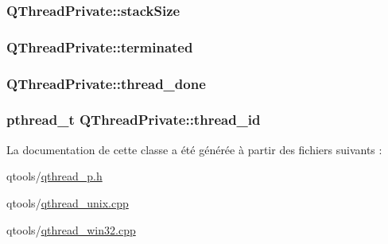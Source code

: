 \subsubsection[{stack\+Size}]{ Q\+Thread\+Private\+::stack\+Size}\label{class_q_thread_private_a7a278caba71183f61e4a11c3d0e89a12}
\hypertarget{class_q_thread_private_af4814bc64bcadcaf0c148a0c0e5923f8}{}
\subsubsection[{terminated}]{ Q\+Thread\+Private\+::terminated}\label{class_q_thread_private_af4814bc64bcadcaf0c148a0c0e5923f8}
\hypertarget{class_q_thread_private_a812ec2aaef47ea81521066b641f9ae05}{}
\subsubsection[{thread\+\_\+done}]{ Q\+Thread\+Private\+::thread\+\_\+done}\label{class_q_thread_private_a812ec2aaef47ea81521066b641f9ae05}
\hypertarget{class_q_thread_private_a149ec58cdf120de1c55fdccd0e108325}{}
\subsubsection[{thread\+\_\+id}]{\setlength{\rightskip}{0pt plus 5cm}pthread\+\_\+t Q\+Thread\+Private\+::thread\+\_\+id}\label{class_q_thread_private_a149ec58cdf120de1c55fdccd0e108325}


La documentation de cette classe a été générée à partir des fichiers suivants \+:\begin{DoxyCompactItemize}
\item 
qtools/\hyperlink{qthread__p_8h}{qthread\+\_\+p.\+h}\item 
qtools/\hyperlink{qthread__unix_8cpp}{qthread\+\_\+unix.\+cpp}\item 
qtools/\hyperlink{qthread__win32_8cpp}{qthread\+\_\+win32.\+cpp}\end{DoxyCompactItemize}

